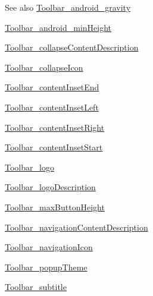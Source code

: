 \begin{DoxySeeAlso}{See also}
\hyperlink{classandroid_1_1support_1_1v4_1_1R_1_1styleable_ac91be82152f33f614697a5b2014cb489}{Toolbar\+\_\+android\+\_\+gravity} 

\hyperlink{classandroid_1_1support_1_1v4_1_1R_1_1styleable_a0d3b075d587ebf9dd415672f35ff77a2}{Toolbar\+\_\+android\+\_\+min\+Height} 

\hyperlink{classandroid_1_1support_1_1v4_1_1R_1_1styleable_a4cbc87868c5e4c8ff2456bc78168f833}{Toolbar\+\_\+collapse\+Content\+Description} 

\hyperlink{classandroid_1_1support_1_1v4_1_1R_1_1styleable_adc48ca7e6b4af1cbf953aca1ddd4dc52}{Toolbar\+\_\+collapse\+Icon} 

\hyperlink{classandroid_1_1support_1_1v4_1_1R_1_1styleable_a32c9d8c6dd8f327b1ee2c2fe3ab0a630}{Toolbar\+\_\+content\+Inset\+End} 

\hyperlink{classandroid_1_1support_1_1v4_1_1R_1_1styleable_ac27607dd846e87108d867c8f656dc01f}{Toolbar\+\_\+content\+Inset\+Left} 

\hyperlink{classandroid_1_1support_1_1v4_1_1R_1_1styleable_aa53bacd1f9f065115238222bc4ca4f5d}{Toolbar\+\_\+content\+Inset\+Right} 

\hyperlink{classandroid_1_1support_1_1v4_1_1R_1_1styleable_ae49023876e1eb052f0650805f60750f1}{Toolbar\+\_\+content\+Inset\+Start} 

\hyperlink{classandroid_1_1support_1_1v4_1_1R_1_1styleable_a02896a17125399cab8807ad63d4b9bf2}{Toolbar\+\_\+logo} 

\hyperlink{classandroid_1_1support_1_1v4_1_1R_1_1styleable_a189537d807b0fafbff95c6fc64aba407}{Toolbar\+\_\+logo\+Description} 

\hyperlink{classandroid_1_1support_1_1v4_1_1R_1_1styleable_a6b04787e5b1049d59002016f695019df}{Toolbar\+\_\+max\+Button\+Height} 

\hyperlink{classandroid_1_1support_1_1v4_1_1R_1_1styleable_a6160a902fc7264d07ae23eb1d7d2e966}{Toolbar\+\_\+navigation\+Content\+Description} 

\hyperlink{classandroid_1_1support_1_1v4_1_1R_1_1styleable_a661ed648518af5edf2636cb075a4fbbe}{Toolbar\+\_\+navigation\+Icon} 

\hyperlink{classandroid_1_1support_1_1v4_1_1R_1_1styleable_a6383da799d3eb15b2f73a0b40c936a2f}{Toolbar\+\_\+popup\+Theme} 

\hyperlink{classandroid_1_1support_1_1v4_1_1R_1_1styleable_a56f57151a46ae8da5d66cce8444fc7f4}{Toolbar\+\_\+subtitle} 


\end{DoxySeeAlso}
